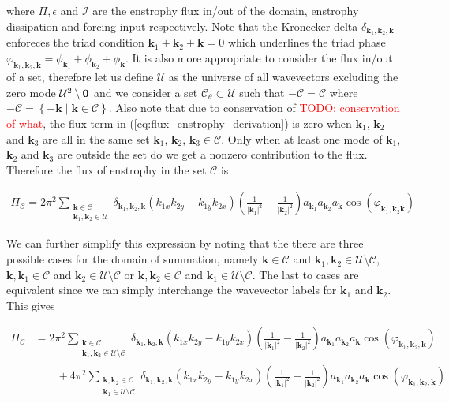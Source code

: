 \documentclass[9pt]{article}
\newcommand{\bfk}{\mathbf{k}}								%
\newcommand{\bfkn}[1]{\mathbf{k}_{#1}}								%
\newcommand{\TODO}[1]{\textcolor{red}{TODO: #1}}
\begin{document}
where $\Pi, \epsilon$ and $\mathcal{I}$ are the enstrophy flux in/out of the domain, enstrophy dissipation and forcing input respectively. Note that the Kronecker delta $\delta_{\bfkn{1}, \bfkn{2},\bfk}$ enforeces the triad condition $\bfkn{1} + \bfkn{2} + \bfk = 0$ which underlines the triad phase $\varphi_{\bfkn{1}, \bfkn{2}, \bfk} = \phi_{\bfkn{1}} + \phi_{\bfkn{2}} + \phi_{\bfk}$. It is also more appropriate to consider the flux in/out of a set, therefore let us define $\mathcal{U}$ as the universe of all wavevectors excluding the zero mode $\mathcal{U} \def \mathbb{Z}^2\setminus \mathbf{0}$ and we consider a set $\mathcal{C}_\theta \subset \mathcal{U}$ such that $-\mathcal{C} = \mathcal{C}$ where $-\mathcal{C} = \left\{-\bfk \mid \bfk \in \mathcal{C}\right\}$. Also note that due to conservation of \TODO{conservation of what}, the flux term in (\ref{eq:flux_enstrophy_derivation}) is zero when $\bfkn{1}$, $\bfkn{2}$ and $\bfkn{3}$ are all in the same set $\bfkn{1}$, $\bfkn{2}$, $\bfkn{3} \in \mathcal{C}$. Only when at least one mode of $\bfkn{1}$, $\bfkn{2}$ and $\bfkn{3}$ are outside the set do we get a nonzero contribution to the flux. Therefore the flux of enstrophy in the set $\mathcal{C}$ is 

\begin{align}
\Pi_{\mathcal{C}} = 2\pi^2	\sum_{\substack{\bfk \in \mathcal{C} \\ \bfkn{1},  \bfkn{2} \in \mathcal{U}}}\delta_{\bfkn{1}, \bfkn{2},\bfk}\left(k_{1x}k_{2y} - k_{1y}k_{2x}\right) \left(\frac{1}{|\bfkn{1}|^2} - \frac{1}{|\bfkn{2}|^2}\right) a_{\bfkn{1}} a_{\bfkn{2}} a_{\bfk} \cos(\varphi_{\bfkn{1}, \bfkn{2} \bfk})
\end{align}

We can further simplify this expression by noting that the there are three possible cases for the domain of summation, namely $\bfk \in \mathcal{C}$ and $\bfkn{1}, \bfkn{2} \in \mathcal{U}\setminus\mathcal{C}$, $\bfk, \bfkn{1}\in \mathcal{C}$ and $ \bfkn{2} \in \mathcal{U}\setminus\mathcal{C}$ or $\bfk, \bfkn{2}\in \mathcal{C}$ and $ \bfkn{1} \in \mathcal{U}\setminus\mathcal{C}$. The last to cases are equivalent since we can simply interchange the wavevector labels for $\bfkn{1}$ and $\bfkn{2}$. This gives

\begin{align}
\Pi_{\mathcal{C}} &= 2\pi^2	\sum_{\substack{\bfk \in \mathcal{C} \\ \bfkn{1},  \bfkn{2} \in \mathcal{U}\setminus \mathcal{C}}}\delta_{\bfkn{1}, \bfkn{2},\bfk}\left(k_{1x}k_{2y} - k_{1y}k_{2x}\right) \left(\frac{1}{|\bfkn{1}|^2} - \frac{1}{|\bfkn{2}|^2}\right) a_{\bfkn{1}} a_{\bfkn{2}} a_{\bfk} \cos(\varphi_{\bfkn{1}, \bfkn{2}, \bfk}) \\ 
&\qquad   + 4\pi^2	\sum_{\substack{\bfk, \bfkn{2} \in \mathcal{C} \\  \bfkn{1} \in \mathcal{U}\setminus \mathcal{C}}}\delta_{\bfkn{1}, \bfkn{2},\bfk}\left(k_{1x}k_{2y} - k_{1y}k_{2x}\right) \left(\frac{1}{|\bfkn{1}|^2} - \frac{1}{|\bfkn{2}|^2}\right) a_{\bfkn{1}} a_{\bfkn{2}} a_{\bfk} \cos(\varphi_{\bfkn{1}, \bfkn{2}, \bfk})
\end{align}
\end{document}
